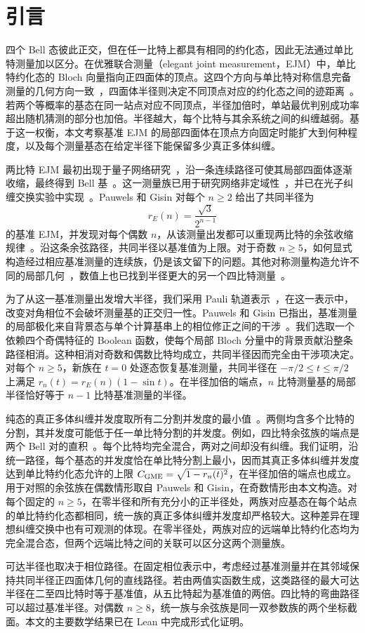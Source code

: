 \section{引言}
\label{intro:section}

四个 Bell 态彼此正交，但在任一比特上都具有相同的约化态，因此无法通过单比特测量加以区分。在优雅联合测量（elegant joint measurement，EJM）中，单比特约化态的 Bloch 向量指向正四面体的顶点。这四个方向与单比特对称信息完备测量的几何方向一致~\cite{Renes2004}，四面体半径则决定不同顶点对应的约化态之间的迹距离~\cite{Czartowski2021}。若两个等概率的基态在同一站点对应不同顶点，半径加倍时，单站最优判别成功率超出随机猜测的部分也加倍。半径越大，每个比特与其余系统之间的纠缠越弱。基于这一权衡，本文考察基准 EJM 的局部四面体在顶点方向固定时能扩大到何种程度，以及每个测量基态在给定半径下能保留多少真正多体纠缠。

两比特 EJM 最初出现于量子网络研究~\cite{Gisin2017,Gisin2019}，沿一条连续路径可使其局部四面体逐渐收缩，最终得到 Bell 基~\cite{Tavakoli2021}。这一测量族已用于研究网络非定域性~\cite{PozasKerstjens2022}，并已在光子纠缠交换实验中实现~\cite{Huang2022}。Pauwels 和 Gisin 对每个 $n\ge2$ 给出了共同半径为
\begin{equation}
 r_E(n)=\frac{\sqrt3}{2^{n-1}}
 \label{intro:reference-radius}
\end{equation}
的基准 EJM，并发现对每个偶数 $n$，从该测量出发都可以重现两比特的余弦收缩规律~\cite{PauwelsGisin2026}。沿这条余弦路径，共同半径以基准值为上限。对于奇数 $n\ge5$，如何显式构造经过相应基准测量的连续族，仍是该文留下的问题。其他对称测量构造允许不同的局部几何~\cite{Ding2025,He2026}，数值上也已找到半径更大的另一个四比特测量~\cite{PauwelsGisin2026}。

为了从这一基准测量出发增大半径，我们采用 Pauli 轨道表示~\cite{PauwelsPauli2026,PauwelsEJM2026}，在这一表示中，改变对角相位不会破坏测量基的正交归一性。Pauwels 和 Gisin 已指出，基准测量的局部极化来自背景态与单个计算基串上的相位修正之间的干涉~\cite{PauwelsGisin2026}。我们选取一个依赖四个奇偶特征的 Boolean 函数，使每个局部 Bloch 分量中的背景贡献沿整条路径相消。这种相消对奇数和偶数比特均成立，共同半径因而完全由干涉项决定。对每个 $n\ge5$，新族在 $t=0$ 处逐态恢复基准测量，共同半径在 $-\pi/2\le t\le\pi/2$ 上满足 $r_n(t)=r_E(n)(1-\sin t)$。在半径加倍的端点，$n$ 比特测量基的局部半径恰好等于 $n-1$ 比特基准测量的半径。

纯态的真正多体纠缠并发度取所有二分割并发度的最小值~\cite{Ma2011}。两侧均含多个比特的分割，其并发度可能低于任一单比特分割的并发度。例如，四比特余弦族的端点是两个 Bell 对的直积~\cite{PauwelsGisin2026}。每个比特均完全混合，两对之间却没有纠缠。我们证明，沿统一路径，每个基态的并发度恰在单比特分割上最小，因而其真正多体纠缠并发度达到单比特约化态允许的上限 $C_{\rm GME}=\sqrt{1-r_n(t)^2}$，在半径加倍的端点也成立。用于对照的余弦族在偶数情形取自 Pauwels 和 Gisin，在奇数情形由本文构造。对每个固定的 $n\ge5$，在零半径和所有充分小的正半径处，两族对应基态在每个站点的单比特约化态都相同，统一族的真正多体纠缠并发度却严格较大。这种差异在理想纠缠交换中也有可观测的体现。在零半径处，两族对应的远端单比特约化态均为完全混合态，但两个远端比特之间的关联可以区分这两个测量族。

可达半径也取决于相位路径。在固定相位表示中，考虑经过基准测量并在其邻域保持共同半径正四面体几何的直线路径。若由两值实函数生成，这类路径的最大可达半径在二至四比特时等于基准值，从五比特起为基准值的两倍。四比特的弯曲路径可以超过基准半径。对偶数 $n\ge8$，统一族与余弦族是同一双参数族的两个坐标截面。本文的主要数学结果已在 Lean 中完成形式化证明。
